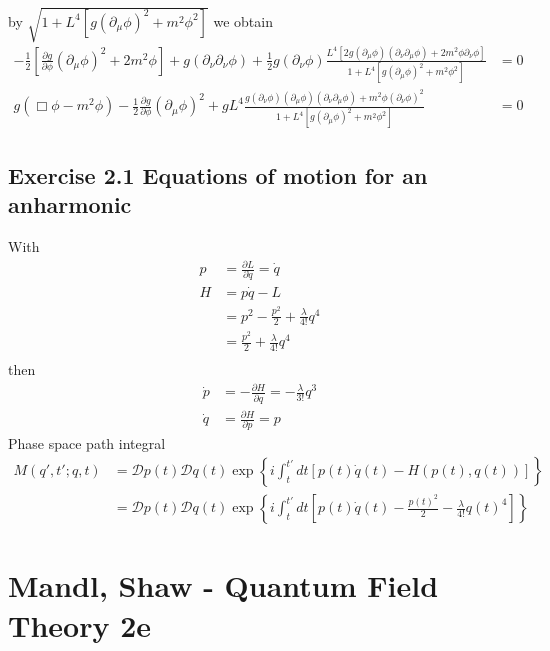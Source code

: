 \documentclass[../main.tex]{subfiles}
\begin{document}
by $\sqrt{1+L^4[g(\partial_\mu\phi)^2+m^2\phi^2]}$ we obtain
\begin{align}
-\frac{1}{2}\left[\frac{\partial g}{\partial\phi}(\partial_\mu\phi)^2+2m^2\phi\right]+g(\partial_\nu\partial_\nu\phi)+\frac{1}{2}g(\partial_\nu\phi)\frac{L^4[2g(\partial_\mu\phi)(\partial_\nu\partial_\mu\phi)+2m^2\phi\partial_\nu\phi]}{1+L^4[g(\partial_\mu\phi)^2+m^2\phi^2]}&=0\\
%
g(\Box\phi-m^2\phi)-\frac{1}{2}\frac{\partial g}{\partial\phi}(\partial_\mu\phi)^2+gL^4\frac{g(\partial_\nu\phi)(\partial_\mu\phi)(\partial_\nu\partial_\mu\phi)+m^2\phi(\partial_\nu\phi)^2}{1+L^4[g(\partial_\mu\phi)^2+m^2\phi^2]}&=0
\end{align}

\subsection{Exercise 2.1 Equations of motion for an anharmonic}
With
\begin{align}
p
&=\frac{\partial L}{\partial \dot{q}}=\dot{q}\\
H
&=p\dot{q}-L\\
&=p^2-\frac{p^2}{2}+\frac{\lambda}{4!}q^4\\
&=\frac{p^2}{2}+\frac{\lambda}{4!}q^4\\
\end{align}
then
\begin{align}
\dot{p}&=-\frac{\partial H}{\partial q}=-\frac{\lambda}{3!}q^3\\
\dot{q}&=\frac{\partial H}{\partial p}=p
\end{align}
Phase space path integral
\begin{align}
M(q',t';q,t)
&=\mathcal{D}p(t)\mathcal{D}q(t)\exp\left\{i\int_t^{t'}dt[p(t)\dot{q}(t)-H(p(t),q(t))]\right\}\\
&=\mathcal{D}p(t)\mathcal{D}q(t)\exp\left\{i\int_t^{t'}dt[p(t)\dot{q}(t)-\frac{p(t)^2}{2}-\frac{\lambda}{4!}q(t)^4]\right\}
\end{align}

\section{{\sc Mandl, Shaw} - Quantum Field Theory 2e}
\end{document}
